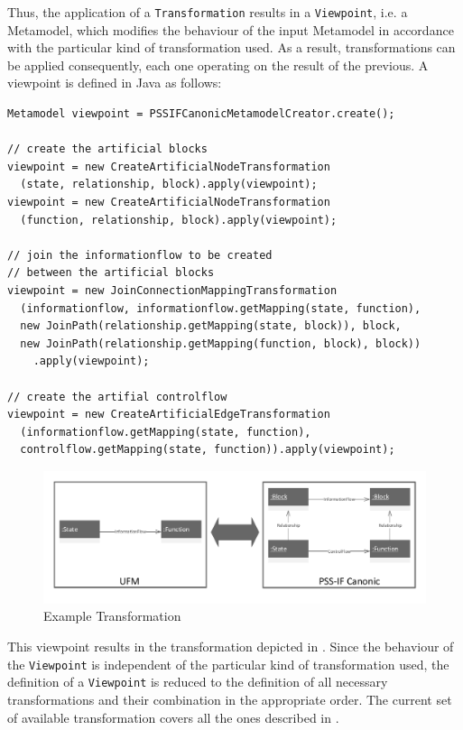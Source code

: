 Thus, the application of a \texttt{Transformation} results in a \texttt{Viewpoint}, i.e. a Metamodel, which modifies the behaviour of the input Metamodel in accordance with the particular kind of transformation used. As a result, transformations can be applied consequently, each one operating on the result of the previous. A viewpoint is defined in Java as follows:

\begin{verbatim}
Metamodel viewpoint = PSSIFCanonicMetamodelCreator.create();

// create the artificial blocks
viewpoint = new CreateArtificialNodeTransformation
  (state, relationship, block).apply(viewpoint);
viewpoint = new CreateArtificialNodeTransformation
  (function, relationship, block).apply(viewpoint);

// join the informationflow to be created
// between the artificial blocks
viewpoint = new JoinConnectionMappingTransformation
  (informationflow, informationflow.getMapping(state, function), 
  new JoinPath(relationship.getMapping(state, block)), block, 
  new JoinPath(relationship.getMapping(function, block), block))
    .apply(viewpoint);

// create the artifial controlflow
viewpoint = new CreateArtificialEdgeTransformation
  (informationflow.getMapping(state, function), 
  controlflow.getMapping(state, function)).apply(viewpoint);
\end{verbatim}

\begin{figure}
\centering
\includegraphics[width=\textwidth]{figures/transformation.pdf}
\caption{Example Transformation}
\label{fig:transformation}
\end{figure}

This viewpoint results in the transformation depicted in . Since the behaviour of the \texttt{Viewpoint} is independent of the particular kind of transformation used, the definition of a \texttt{Viewpoint} is reduced to the definition of all necessary transformations and their combination in the appropriate order. The current set of available transformation covers all the ones described in .

